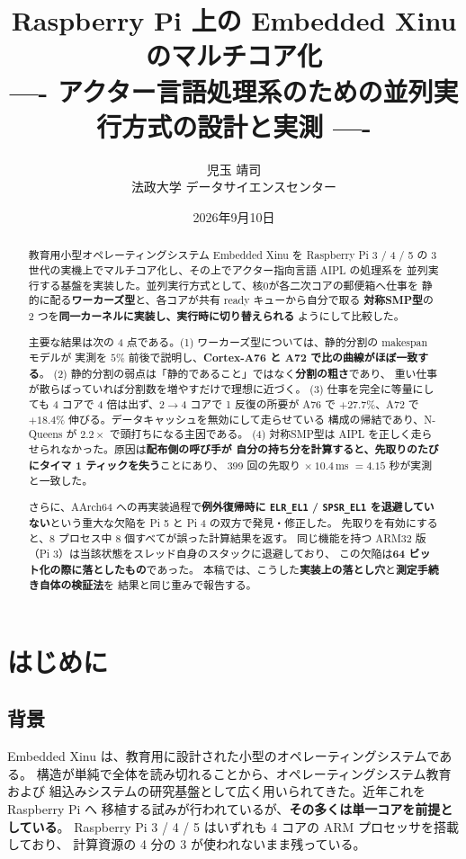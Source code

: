 \documentclass[a4paper,11pt]{ltjsarticle}
\title{Raspberry Pi 上の Embedded Xinu のマルチコア化\\
\large ---- アクター言語処理系のための並列実行方式の設計と実測 ----}
\author{児玉 靖司\\法政大学 データサイエンスセンター}
\date{2026年9月10日}
\begin{document}
\maketitle

\begin{abstract}
教育用小型オペレーティングシステム Embedded Xinu を Raspberry Pi 3 / 4 / 5 の
3 世代の実機上でマルチコア化し、その上でアクター指向言語 AIPL の処理系を
並列実行する基盤を実装した。並列実行方式として、核0が各二次コアの郵便箱へ仕事を
静的に配る\textbf{ワーカーズ型}と、各コアが共有 ready キューから自分で取る
\textbf{対称SMP型}の 2 つを\textbf{同一カーネルに実装し、実行時に切り替えられる}
ようにして比較した。

主要な結果は次の 4 点である。(1) ワーカーズ型については、静的分割の makespan モデルが
実測を $5\%$ 前後で説明し、\textbf{Cortex-A76 と A72 で比の曲線がほぼ一致する}。
(2) 静的分割の弱点は「静的であること」ではなく\textbf{分割の粗さ}であり、
重い仕事が散らばっていれば分割数を増やすだけで理想に近づく。
(3) 仕事を完全に等量にしても 4 コアで 4 倍は出ず、2$\to$4 コアで 1 反復の所要が
A76 で $+27.7\%$、A72 で $+18.4\%$ 伸びる。データキャッシュを無効にして走らせている
構成の帰結であり、N-Queens が $2.2\times$ で頭打ちになる主因である。
(4) 対称SMP型は AIPL を正しく走らせられなかった。原因は\textbf{配布側の呼び手が
自分の持ち分を計算すると、先取りのたびにタイマ 1 ティックを失う}ことにあり、
399 回の先取り $\times\ 10.4$\,ms $= 4.15$ 秒が実測と一致した。

さらに、AArch64 への再実装過程で\textbf{例外復帰時に \texttt{ELR\_EL1} /
\texttt{SPSR\_EL1} を退避していない}という重大な欠陥を Pi 5 と Pi 4 の双方で発見・修正した。
先取りを有効にすると、8 プロセス中 8 個すべてが誤った計算結果を返す。
同じ機能を持つ ARM32 版（Pi 3）は当該状態をスレッド自身のスタックに退避しており、
この欠陥は\textbf{64 ビット化の際に落としたもの}であった。
本稿では、こうした\textbf{実装上の落とし穴}と\textbf{測定手続き自体の検証法}を
結果と同じ重みで報告する。
\end{abstract}

\section{はじめに}

\subsection{背景}
Embedded Xinu\cite{comer,embxinu} は、教育用に設計された小型のオペレーティングシステムである。
構造が単純で全体を読み切れることから、オペレーティングシステム教育および
組込みシステムの研究基盤として広く用いられてきた。近年これを Raspberry Pi へ
移植する試みが行われているが、\textbf{その多くは単一コアを前提としている}。
Raspberry Pi 3 / 4 / 5 はいずれも 4 コアの ARM プロセッサを搭載しており、
計算資源の 4 分の 3 が使われないまま残っている。
\end{document}
